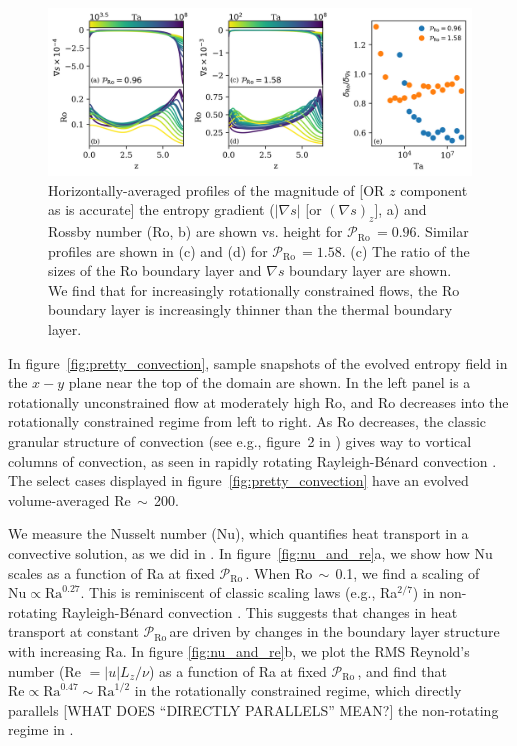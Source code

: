 \documentclass[twocolumn, amsmath, amsfonts, amssymb]{aastex62}
\newcommand{\grad}{\ensuremath{\nabla}}
\newcommand{\RB}{Rayleigh-B\'{e}nard }
\newcommand{\pro}{\ensuremath{\mathcal{P}_{\text{Ro}}\,}}
\begin{document}
\begin{figure}[ht!]
    \includegraphics[width=\textwidth]{./figs/boundary_layers.png}
    \caption{Horizontally-averaged profiles of the magnitude of [OR $z$ component as is accurate] the entropy gradient ($|\grad s|$ [or $(\grad s)_z$], a)
    and Rossby number (Ro, b) are shown vs. height for $\pro = 0.96$. 
    Similar profiles are shown in (c) and (d) for $\pro = 1.58$. 
    (c) The ratio of the sizes of the Ro boundary layer and $\grad s$ boundary layer are
    shown. We find that for increasingly rotationally constrained flows, the Ro boundary layer
    is increasingly thinner than the thermal boundary layer.
    \label{fig:profiles_and_bls} }
\end{figure}

In figure~\ref{fig:pretty_convection}, sample snapshots
of the evolved entropy field in the $x-y$ plane near the top of the domain are shown. 
In the left panel is a rotationally unconstrained flow at moderately high
Ro, and Ro decreases into the rotationally constrained regime from left to right.
As Ro decreases, the
classic granular structure of convection (see e.g., figure~2 in \AB) gives way to vortical
columns of convection, as seen in rapidly rotating \RB convection \citep{stellmach&all2014}.
The select cases displayed in figure~\ref{fig:pretty_convection} have an evolved volume-averaged
Re$\,\sim\,$200.

We measure the Nusselt number (Nu), which quantifies heat transport in a convective
solution, as we did in \AB.
In figure~\ref{fig:nu_and_re}a, we show how Nu scales as a function
of Ra at fixed \pro. When Ro$\,\sim\,$0.1,
we find a scaling of $\text{Nu} \propto \text{Ra}^{0.27}$. This is reminiscent of
classic scaling laws (e.g., Ra$^{2/7}$) in non-rotating \RB convection \citep{ahlers&all2009}.
This suggests that changes in heat transport at constant \pro are driven by
changes in the boundary layer structure with increasing Ra.
In figure \ref{fig:nu_and_re}b, we plot the RMS Reynold's
number (Re $= |u| L_z / \nu$) as a function of Ra at fixed \pro, and find that 
$\text{Re} \propto \text{Ra}^{0.47} \sim \text{Ra}^{1/2}$ in the rotationally constrained regime,
which directly parallels [WHAT DOES ``DIRECTLY PARALLELS'' MEAN?] the non-rotating regime in \AB.
\end{document}
